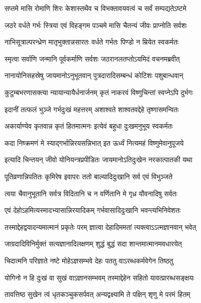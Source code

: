 \twolineshloka
{सप्तमे मासि रोमाणि शिरः केशास्तथैव च}
{विभक्तावयवत्वं च सर्वं सम्पद्यतेऽष्टमे} %

\twolineshloka
{जठरे वर्धते गर्भः स्त्रिया एवं विहङ्गम}
{पञ्चमे मासि चैतन्यं जीवः प्राप्नोति सर्वशः} %

\twolineshloka
{नाभिसूत्राल्परन्ध्रेण मातृभुक्तान्नसारतः}
{वर्धते गर्भतः पिण्डो न म्रियेत स्वकर्मतः} %

\twolineshloka
{स्मृत्वा सर्वाणि जन्मानि पूर्वकर्माणि सर्वशः}
{जठरानलतप्तोऽयमिदं वचनमब्रवीत्} %

\twolineshloka
{नानायोनिसहस्रेषु जायमानोऽनुभूतवान्}
{पुत्रदारादिसम्बन्धं कोटिशः पशुबान्धवान्} %

\twolineshloka
{कुटुम्बभरणासक्त्या न्यायान्यायैर्धनार्जनम्}
{कृतं नाकरवं विष्णुचिन्तां स्वप्नेऽपि दुर्भगः} %

\twolineshloka
{इदानीं तत्फलं भुञ्जे गर्भदुःखं महत्तरम्}
{अशाश्वते शाश्वतवद्देहे तृष्णासमन्वितः} %

\twolineshloka
{अकार्याण्येव कृतवान्न कृतं हितमात्मनः}
{इत्येवं बहुधा दुःखमनुभूय स्वकर्मतः} %

\twolineshloka
{कदा निष्क्रमणं मे स्याद्गर्भान्निरयसन्निभात्}
{इत ऊर्ध्वं नित्यमहं विष्णुमेवानुपूजये} %

\twolineshloka
{इत्यादि चिन्तयन् जीवो योनियन्त्रप्रपीडितः}
{जायमानोऽतिदुःखेन नरकात्पातकी यथा} %

\twolineshloka
{पूतिव्रणान्निपतितः कृमिरेष इवापरः}
{ततो बाल्यादिदुःखानि सर्व एवं विभुञ्जते} %

\twolineshloka
{त्वया चैवानुभूतानि सर्वत्र विदितानि च}
{न वर्णितानि मे गृध्र यौवनादिषु सर्वतः} %

\twolineshloka
{एवं देहोऽहमित्यस्मादभ्यासान्निरयादिकम्}
{गर्भवासादिदुःखानि भवन्त्यभिनिवेशतः} %

\twolineshloka
{तस्माद्देहद्वयादन्यमात्मानं प्रकृतेः परम्}
{ज्ञात्वा देहादिममतां त्यक्त्वाऽऽत्मज्ञानवान् भवेत्} %

\twolineshloka
{जाग्रदादिविनिर्मुक्तं सत्यज्ञानादिलक्षणम्}
{शुद्धं बुद्धं सदा शान्तमात्मानमवधारयेत्} %

\twolineshloka
{चिदात्मनि परिज्ञाते नष्टे मोहेऽज्ञसम्भवे}
{देहः पततु वाऽरब्धकर्मवेगेन तिष्ठतु} %

\twolineshloka
{योगिनो न हि दुःखं वा सुखं वाऽज्ञानसम्भवम्}
{तस्माद्देहेन सहितो यावत्प्रारब्धसङ्क्षयः} %

\twolineshloka
{तावत्तिष्ठ सुखेन त्वं धृतकञ्चुकसर्पवत्}
{अन्यद्वक्ष्यामि ते पक्षिन् शृणु मे परमं हितम्} %

